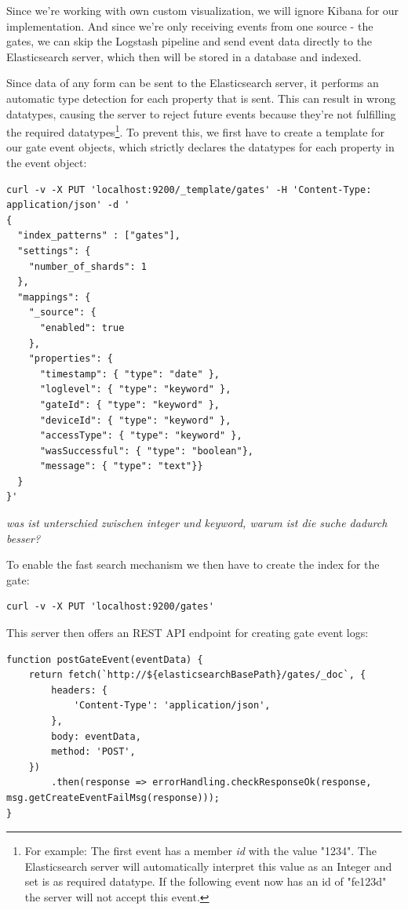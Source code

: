 Since we're working with own custom visualization, we will ignore Kibana for our implementation. And since we're only receiving events  from one source - the gates, we can skip the Logstash pipeline and send event data directly to the Elasticsearch server, which then will be stored in a database and indexed.

Since data of any form can be sent to the Elasticsearch server, it performs an automatic type detection for each property that is sent. This can result in wrong datatypes, causing the server to reject future events because they're not fulfilling the required datatypes\footnote{For example: The first event has a member \emph{id} with the value "1234". The Elasticsearch server will automatically interpret this value as an Integer and set is as required datatype. If the following event now has an id of "fe123d" the server will not accept this event.}. To prevent this, we first have to create a template for our gate event objects, which strictly declares the datatypes for each property in the event object:

\begin{lstlisting}[label=curlScriptTemplateElastic]
curl -v -X PUT 'localhost:9200/_template/gates' -H 'Content-Type: application/json' -d '
{
  "index_patterns" : ["gates"],
  "settings": {
    "number_of_shards": 1
  },
  "mappings": {
    "_source": {
      "enabled": true
    },
    "properties": {
      "timestamp": { "type": "date" },
      "loglevel": { "type": "keyword" },
      "gateId": { "type": "keyword" },
      "deviceId": { "type": "keyword" },
      "accessType": { "type": "keyword" },
      "wasSuccessful": { "type": "boolean"},
      "message": { "type": "text"}}
  }
}'
\end{lstlisting}

\emph{was ist unterschied zwischen integer und keyword, warum ist die suche dadurch besser?}

To enable the fast search mechanism we then have to create the index for the gate:

\begin{lstlisting}[label=curlScriptElastic]
curl -v -X PUT 'localhost:9200/gates'
\end{lstlisting}

This server then offers an REST API endpoint for creating gate event logs:
\begin{lstlisting}[label=searchElasticPOST]
function postGateEvent(eventData) {
    return fetch(`http://${elasticsearchBasePath}/gates/_doc`, {
        headers: {
            'Content-Type': 'application/json',
        },
        body: eventData,
        method: 'POST',
    })
        .then(response => errorHandling.checkResponseOk(response, msg.getCreateEventFailMsg(response)));
}
\end{lstlisting}


